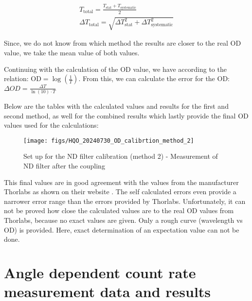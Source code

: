 \begin{align}
    T_{\text{total}} = \frac{T_{\text{stat}} + T_{\text{systematic}}}{2}\\
    \Delta T_{\text{total}} = \sqrt{\Delta T_{\text{stat}}^2 + \Delta T_{\text{systematic}}^2}
\end{align}

Since, we do not know from which method the results are closer to the real OD value, we take the mean value of both values.

Continuing with the calculation of the OD value, we have according to \cite{Thorlabs-OD} the relation:
 $\text{OD}= \log(\frac{1}{T})$.
From this, we can calculate the error for the OD: $\Delta OD = \frac{\Delta T}{\ln(10) \cdot T}$



Below are the tables with the calculated values and results for the first and second method, as well for the combined results
which lastly provide the final OD values used for the calculations:

%




\begin{figure}
    \centering
    \texttt{[image: figs/HQO\_20240730\_OD\_calibrtion\_method\_2]}
    \caption{Set up for the ND filter calibration (method 2) - Measurement of ND filter after the coupling}
    \label{fig: OD_calibration_method_2}
\end{figure}

\FloatBarrier
%
This final values are in good agreement with the values from the manufacturer Thorlabs as shown on their website \cite{Thorlabs-OD}.
The self calculated errors even provide a narrower error range than the errors provided by Thorlabs.
Unfortunately, it can not be proved how close the calculated values are to the real OD values from Thorlabs, because no
exact values are given.
Only a rough curve (wavelength vs OD) is provided.
Here, exact determination of an expectation value can not be done.

\newpage
\section{Angle dependent count rate measurement data and results}\label{sec:angle_dependent_countrate_results_appendix}

